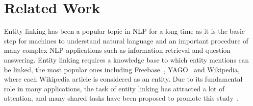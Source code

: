 \section{Related Work}

Entity linking has been a popular topic in NLP for a long time as it is the basic step for machines to understand natural language and an important procedure of many complex NLP applications such as information retrieval and question answering. Entity linking requires a knowledge base to which entity mentions can be linked, the most popular ones including Freebase~\cite{bollacker2008freebase}, YAGO~\cite{suchanek2007yago} and Wikipedia, where each Wikipedia article is considered as an entity. 
Due to its fundamental role in many applications, the task of entity linking has attracted a lot of attention, and many shared tasks have been proposed to promote this study~\cite{ji2010overview,cano2014microposts2014,carmel2014erd}.
